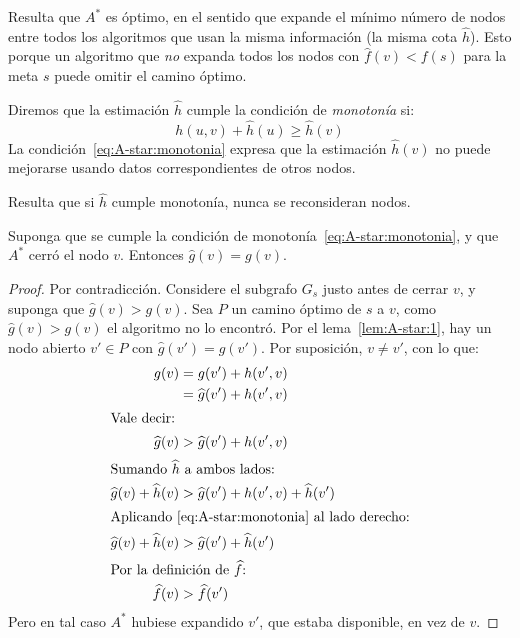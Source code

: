   Resulta que \(A^*\) es óptimo,
  en el sentido que expande el mínimo número de nodos
  entre todos los algoritmos que usan la misma información
  (la misma cota \(\widehat{h}\)).
  Esto porque un algoritmo que \emph{no} expanda
  todos los nodos con \(\widehat{f}(v) < f(s)\) para la meta \(s\)
  puede omitir el camino óptimo.

  Diremos que la estimación \(\widehat{h}\)
  cumple la condición de \emph{monotonía} si:
  \begin{equation}
    \label{eq:A-star:monotonia}
    h(u, v) + \widehat{h}(u)
      \ge \widehat{h}(v)
  \end{equation}
  La condición~\eqref{eq:A-star:monotonia}
  expresa que la estimación \(\widehat{h}(v)\)
  no puede mejorarse usando datos correspondientes de otros nodos.

  Resulta que si \(\widehat{h}\) cumple monotonía,
  nunca se reconsideran nodos.
  \begin{lemma}
    \label{lem:A-star:2}
    Suponga que se cumple
    la condición de monotonía~\eqref{eq:A-star:monotonia},
    y que \(A^*\) cerró el nodo \(v\).
    Entonces \(\widehat{g}(v) = g(v)\).
  \end{lemma}
  \begin{proof}
    Por contradicción.
    Considere el subgrafo \(G_s\) justo antes de cerrar \(v\),
    y suponga que \(\widehat{g}(v) > g(v)\).
    Sea \(P\) un camino óptimo de \(s\) a \(v\),
    como \(\widehat{g}(v) > g(v)\) el algoritmo no lo encontró.
    Por el lema~\ref{lem:A-star:1},
    hay un nodo abierto \(v' \in P\) con \(\widehat{g}(v') = g(v')\).
    Por suposición,
    \(v \ne v'\),
    con lo que:
    \begin{align*}
      g(v)
        &= g(v') + h(v', v) \\
        &= \widehat{g}(v') + h(v', v) \\
    \intertext{Vale decir:}
      \widehat{g}(v)
        &> \widehat{g}(v') + h(v', v) \\
    \intertext{Sumando \(\widehat{h}\) a ambos lados:}
      \widehat{g}(v) + \widehat{h}(v)
        &> \widehat{g}(v') + h(v', v) + \widehat{h}(v') \\
    \intertext{Aplicando~\eqref{eq:A-star:monotonia} al lado derecho:}
      \widehat{g}(v) + \widehat{h}(v)
        &> \widehat{g}(v') + \widehat{h}(v') \\
    \intertext{Por la definición de \(\widehat{f}\):}
      \widehat{f}(v)
        &> \widehat{f}(v')
    \end{align*}
    Pero en tal caso \(A^*\) hubiese expandido \(v'\),
    que estaba disponible,
    en vez de \(v\).
  \end{proof}

